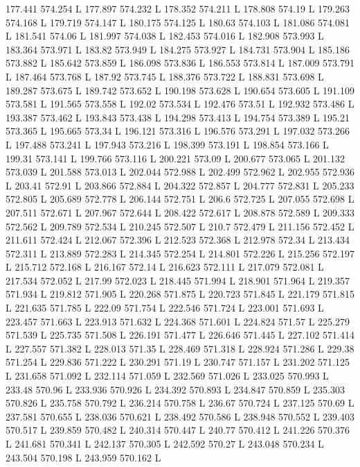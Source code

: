 177.441 574.254 L
177.897 574.232 L
178.352 574.211 L
178.808 574.19 L
179.263 574.168 L
179.719 574.147 L
180.175 574.125 L
180.63 574.103 L
181.086 574.081 L
181.541 574.06 L
181.997 574.038 L
182.453 574.016 L
182.908 573.993 L
183.364 573.971 L
183.82 573.949 L
184.275 573.927 L
184.731 573.904 L
185.186 573.882 L
185.642 573.859 L
186.098 573.836 L
186.553 573.814 L
187.009 573.791 L
187.464 573.768 L
187.92 573.745 L
188.376 573.722 L
188.831 573.698 L
189.287 573.675 L
189.742 573.652 L
190.198 573.628 L
190.654 573.605 L
191.109 573.581 L
191.565 573.558 L
192.02 573.534 L
192.476 573.51 L
192.932 573.486 L
193.387 573.462 L
193.843 573.438 L
194.298 573.413 L
194.754 573.389 L
195.21 573.365 L
195.665 573.34 L
196.121 573.316 L
196.576 573.291 L
197.032 573.266 L
197.488 573.241 L
197.943 573.216 L
198.399 573.191 L
198.854 573.166 L
199.31 573.141 L
199.766 573.116 L
200.221 573.09 L
200.677 573.065 L
201.132 573.039 L
201.588 573.013 L
202.044 572.988 L
202.499 572.962 L
202.955 572.936 L
203.41 572.91 L
203.866 572.884 L
204.322 572.857 L
204.777 572.831 L
205.233 572.805 L
205.689 572.778 L
206.144 572.751 L
206.6 572.725 L
207.055 572.698 L
207.511 572.671 L
207.967 572.644 L
208.422 572.617 L
208.878 572.589 L
209.333 572.562 L
209.789 572.534 L
210.245 572.507 L
210.7 572.479 L
211.156 572.452 L
211.611 572.424 L
212.067 572.396 L
212.523 572.368 L
212.978 572.34 L
213.434 572.311 L
213.889 572.283 L
214.345 572.254 L
214.801 572.226 L
215.256 572.197 L
215.712 572.168 L
216.167 572.14 L
216.623 572.111 L
217.079 572.081 L
217.534 572.052 L
217.99 572.023 L
218.445 571.994 L
218.901 571.964 L
219.357 571.934 L
219.812 571.905 L
220.268 571.875 L
220.723 571.845 L
221.179 571.815 L
221.635 571.785 L
222.09 571.754 L
222.546 571.724 L
223.001 571.693 L
223.457 571.663 L
223.913 571.632 L
224.368 571.601 L
224.824 571.57 L
225.279 571.539 L
225.735 571.508 L
226.191 571.477 L
226.646 571.445 L
227.102 571.414 L
227.557 571.382 L
228.013 571.35 L
228.469 571.318 L
228.924 571.286 L
229.38 571.254 L
229.836 571.222 L
230.291 571.19 L
230.747 571.157 L
231.202 571.125 L
231.658 571.092 L
232.114 571.059 L
232.569 571.026 L
233.025 570.993 L
233.48 570.96 L
233.936 570.926 L
234.392 570.893 L
234.847 570.859 L
235.303 570.826 L
235.758 570.792 L
236.214 570.758 L
236.67 570.724 L
237.125 570.69 L
237.581 570.655 L
238.036 570.621 L
238.492 570.586 L
238.948 570.552 L
239.403 570.517 L
239.859 570.482 L
240.314 570.447 L
240.77 570.412 L
241.226 570.376 L
241.681 570.341 L
242.137 570.305 L
242.592 570.27 L
243.048 570.234 L
243.504 570.198 L
243.959 570.162 L
